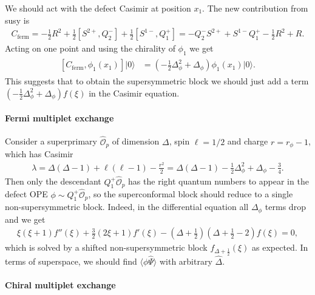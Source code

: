 \documentclass[letterpaper]{article}
\def\Om{{\mathcal{O}}}
\begin{document}
We should act with the defect Casimir at position $x_1$. 
The new contribution from susy is 
\begin{align}
 C_{\text{ferm}} =
 - \frac{1}{2} R^2 
 + \frac{1}{2} [S^{2+}, Q^-_2] 
 + \frac{1}{2} [S^{1-}, Q^+_1] 
 = - Q^-_2 S^{2+} 
   + S^{1-} Q^+_1 
   - \frac{1}{2} R^2 
   + R.
\end{align}
Acting on one point and using the chirality of $\phi_1$ we get
\begin{align}
\begin{split}
 [C_{\text{ferm}}, \phi_1(x_1) ] |0\rangle
 & = \left( -\frac{1}{2} \Delta_\phi^2 + \Delta_\phi \right) \phi_1(x_1) |0\rangle.
\end{split}
\end{align}
This suggests that to obtain the supersymmetric block we should just add a term
$( -\frac{1}{2} \Delta_\phi^2 + \Delta_\phi ) f(\xi)$ in the Casimir equation.

\paragraph{Fermi multiplet exchange}

Consider a superprimary $\hat \Om_{p}$ of dimension $\Delta$, spin $\ell = 1/2$ and charge $r = r_\phi - 1$, which has Casimir
\begin{align}
 \lambda 
 = \Delta(\Delta-1) + \ell(\ell - 1) - \frac{r^2}{2} 
 = \Delta(\Delta-1) -\frac{1}{2} \Delta_\phi^2 + \Delta_\phi - \frac{3}{4}.
\end{align}
Then only the descendant $Q^+_{1} \hat \Om_{p}$ has the right quantum numbers to appear in the defect OPE $\phi \sim Q^+_{1} \hat \Om_{p}$, so the superconformal block should reduce to a single non-supersymmetric block.
Indeed, in the differential equation all $\Delta_\phi$ terms drop and we get
\begin{align}
 \xi  (\xi +1) f''(\xi )+\frac{3}{2} (2 \xi +1) f'(\xi )
 -\left(\Delta + \frac{1}{2} \right) \left( \Delta + \frac{1}{2} - 2 \right) f(\xi ) = 0,
\end{align}
which is solved by a shifted non-supersymmetric block $f_{\Delta+\frac{1}{2}}(\xi)$ as expected.
In terms of superspace, we should find $\langle \phi \hat \Psi \rangle$ with arbitrary $\hat \Delta$.

\paragraph{Chiral multiplet exchange}
\end{document}
